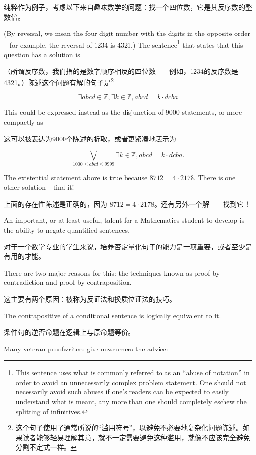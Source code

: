 纯粹作为例子，考虑以下来自趣味数学的问题：找一个四位数，它是其反序数的整数倍。

(By reversal, we mean the four
digit number with the digits in the opposite order -- for example, the
reversal of 1234 is 4321.)  The sentence\footnote{This sentence uses what %
is commonly referred to as an ``abuse of notation'' in order to avoid an %
unnecessarily complex problem statement.
One should not necessarily %
avoid such abuses if one's readers can be expected to easily understand %
what is meant, any more than one should completely eschew the splitting %
of infinitives.}
that states that this question has a solution is

（所谓反序数，我们指的是数字顺序相反的四位数——例如，1234的反序数是4321。）陈述这个问题有解的句子是\footnote{这个句子使用了通常所说的“滥用符号”，以避免不必要地复杂化问题陈述。如果读者能够轻易理解其意，就不一定需要避免这种滥用，就像不应该完全避免分割不定式一样。}

\[
\exists abcd \in {\mathbb Z},  \exists k \in {\mathbb Z}, abcd = k\cdot dcba
\]

This could be expressed instead as the disjunction of 9000 statements, or more 
compactly as

这可以被表达为9000个陈述的析取，或者更紧凑地表示为

\[
\bigvee_{1000\leq abcd \leq 9999}  \exists k \in {\mathbb Z}, abcd = k\cdot dcba.
\]

\begin{exer} The existential statement above is true because $8712 = 4\cdot 2178$.
There is one other solution -- find it!

上面的存在性陈述是正确的，因为 $8712 = 4\cdot 2178$。还有另外一个解——找到它！
\end{exer}

An important, or at least useful, talent for a Mathematics student to develop
is the ability to negate quantified sentences.

对于一个数学专业的学生来说，培养否定量化句子的能力是一项重要，或者至少是有用的才能。

There are two major reasons for this:
the techniques known as proof by contradiction and proof by contraposition.

这主要有两个原因：被称为反证法和换质位证法的技巧。

The contrapositive of a conditional sentence is logically
equivalent to it.

条件句的逆否命题在逻辑上与原命题等价。

Many veteran proofwriters give newcomers the advice:

